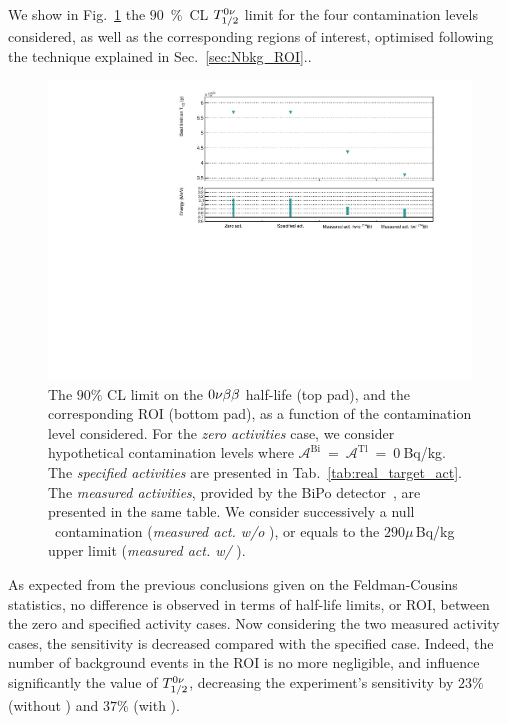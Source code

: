 \paragraph{} We show in Fig.~\ref{fig:real_target_act} the $90$~\%~CL $T_{1/2}^{0\nu}$ limit for the four contamination levels considered, as well as the corresponding regions of interest, optimised following the technique explained in Sec.~\ref{sec:Nbkg_ROI}..
\begin{figure}[h!]
  \centering
  \includegraphics[width=1.1\textwidth]{Sensitivity/fig_sensitivity/contamination_level_Se_B.pdf}
  \caption{The $90\%$ CL limit on the $0\nu\beta\beta$ half-life (top pad), and the corresponding ROI (bottom pad), as a function of the contamination level considered.
    For the \emph{zero activities} case, we consider hypothetical contamination levels where $\mathcal{A}^{\text{Bi}}~=~\mathcal{A}^{\text{Tl}}~=~0~$Bq/kg.
    The \emph{specified activities} are presented in Tab.~\ref{tab:real_target_act}.
    The \emph{measured activities}, provided by the BiPo detector~\cite{internal:bipo}, are presented in the same table.
    We consider successively a null \Bi\ contamination (\emph{measured act. w/o \Bi}), or equals to the $290\mu\,$Bq/kg upper limit (\emph{measured act. w/ \Bi}).
    \label{fig:real_target_act}}
\end{figure}
As expected from the previous conclusions given on the Feldman-Cousins statistics, no difference is observed in terms of half-life limits, or ROI, between the zero and specified activity cases.
Now considering the two measured activity cases, the sensitivity is decreased compared with the specified case.
Indeed, the number of background events in the ROI is no more negligible, and influence significantly the value of $T_{1/2}^{0\nu}$, decreasing the experiment's sensitivity by $23\%$ (without \Bi) and $37\%$ (with \Bi).

